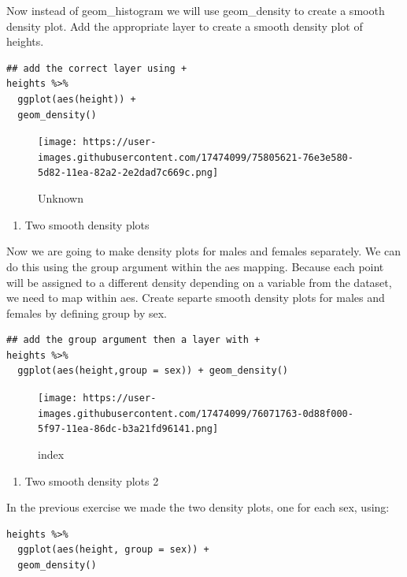 \documentclass[
]{article}
\providecommand{\tightlist}{%
  \setlength{\itemsep}{0pt}\setlength{\parskip}{0pt}}
\begin{document}
Now instead of geom\_histogram we will use geom\_density to create a
smooth density plot. Add the appropriate layer to create a smooth
density plot of heights.

\begin{verbatim}
## add the correct layer using +
heights %>% 
  ggplot(aes(height)) +
  geom_density()
\end{verbatim}

\begin{figure}
\centering
\texttt{[image: https://user-images.githubusercontent.com/17474099/75805621-76e3e580-5d82-11ea-82a2-2e2dad7c669c.png]}
\caption{Unknown}
\end{figure}

\begin{enumerate}
\def\labelenumi{\arabic{enumi}.}
\setcounter{enumi}{19}
\tightlist
\item
  Two smooth density plots
\end{enumerate}

Now we are going to make density plots for males and females separately.
We can do this using the group argument within the aes mapping. Because
each point will be assigned to a different density depending on a
variable from the dataset, we need to map within aes. Create separte
smooth density plots for males and females by defining group by sex.

\begin{verbatim}
## add the group argument then a layer with +
heights %>% 
  ggplot(aes(height,group = sex)) + geom_density()
\end{verbatim}

\begin{figure}
\centering
\texttt{[image: https://user-images.githubusercontent.com/17474099/76071763-0d88f000-5f97-11ea-86dc-b3a21fd96141.png]}
\caption{index}
\end{figure}

\begin{enumerate}
\def\labelenumi{\arabic{enumi}.}
\setcounter{enumi}{20}
\tightlist
\item
  Two smooth density plots 2
\end{enumerate}

In the previous exercise we made the two density plots, one for each
sex, using:

\begin{verbatim}
heights %>% 
  ggplot(aes(height, group = sex)) + 
  geom_density()
\end{verbatim}
\end{document}
